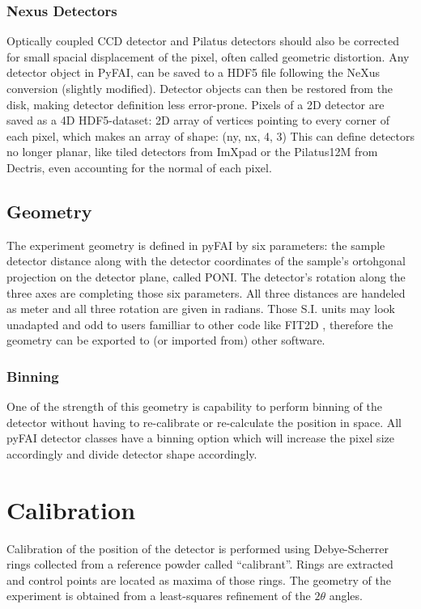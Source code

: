 \documentclass[preprint]{iucr}
\begin{document}
\subsubsection{Nexus Detectors}
Optically coupled CCD detector and Pilatus detectors should also be corrected
for small spacial displacement of the pixel, often called geometric distortion.
Any detector object in PyFAI, can be saved to a HDF5 file
following the NeXus conversion (slightly modified).
Detector objects can then be restored from the disk, making detector definition
less error-prone.
Pixels of a 2D detector are saved as a 4D HDF5-dataset: 2D array of vertices
pointing to every corner of each pixel, which makes an array of shape: (ny, nx, 4, 3)
This can define detectors no longer planar, like tiled detectors from
ImXpad or the Pilatus12M from Dectris, even accounting for the normal of each
pixel.

\subsection{Geometry}
The experiment geometry is defined in pyFAI by six parameters: the sample
detector distance along with the detector coordinates of the sample's ortohgonal
projection on the detector plane, called PONI. The detector's rotation along the
three axes are completing those six parameters. All three distances are handeled
as meter and all three rotation are given in radians. Those S.I. units may look
unadapted and odd to users familliar to other code like FIT2D \cite{fit2d},
therefore the geometry can be exported to (or imported from) other software.   

 
\subsubsection{Binning}
One of the strength of this geometry is capability to perform binning of the
detector without having to re-calibrate or re-calculate the position in space.
All pyFAI detector classes have a binning option which will increase the pixel
size accordingly and divide detector shape accordingly.

\section{Calibration}
Calibration of the position of the detector is performed using Debye-Scherrer
rings collected from a reference powder called ``calibrant''.
Rings are extracted and control points are located as maxima of those rings.
The geometry of the experiment is obtained from a least-squares refinement of
the $2\theta$ angles.
\end{document}
